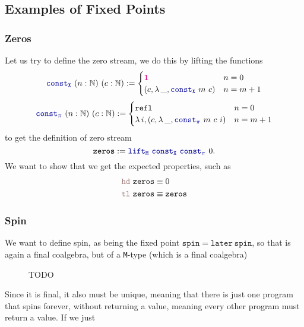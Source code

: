 \documentclass[twoside,11pt,openright]{report}
\theoremstyle{plain} %
\theoremstyle{definition}
\theoremstyle{remark}
\newcommand*{\type}[1]{\textcolor{magenta!90!black}{#1}}
\newcommand*{\unit}{\type{\textbf{1}}}
\newcommand*{\function}[1]{\textcolor{blue!60!black}{\ensuremath{\mathtt{#1}}}}
\newcommand*{\destructor}[1]{\textcolor{pink!60!black}{\ensuremath{\mathtt{#1}}}}
\begin{document}
\subsection{Examples of Fixed Points}
\subsubsection{Zeros}
Let us try to define the zero stream, we do this by lifting the functions
\begin{equation}
  \function{const_X}~(n : \mathbb{N})~(c : \mathbb{N})  := \begin{cases} \unit & n = 0 \\ (c , \lambda\,\_, \function{const_X}~m~c) & n = m + 1 \end{cases}
\end{equation}
\begin{equation}
  \function{const_\pi}~(n : \mathbb{N})~(c : \mathbb{N}) := \begin{cases} \mathtt{refl} & n = 0 \\ \lambda\,i,(c , \lambda\,\_, \function{const_\pi}~m~c~i) & n = m + 1 \end{cases}
\end{equation}
to get the definition of zero stream
\begin{equation}
  \mathtt{zeros} := \function{lift_M}~\function{const_X}~\function{const_\pi}~0.
\end{equation}
We want to show that we get the expected properties, such as
\begin{align}
  \destructor{hd}~\mathtt{zeros} &\equiv 0 \\
  \destructor{tl}~\mathtt{zeros} &\equiv \mathtt{zeros}
\end{align}

\subsubsection{Spin}
We want to define spin, as being the fixed point \(\mathtt{spin} = \mathtt{later}~\mathtt{spin}\), so that is again a final coalgebra, but of a \texttt{M}-type (which is a final coalgebra)

\begin{figure}[h]
  \centering
  \caption{TODO}
\end{figure}
\noindent Since it is final, it also must be unique, meaning that there is just one program that spins forever, without returning a value, meaning every other program must return a value. If we just
\end{document}
